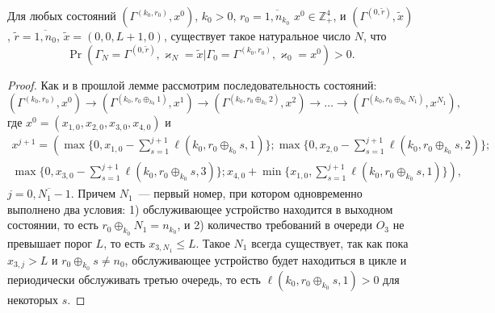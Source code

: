 \documentclass[a4paper,12pt,russian]{extarticle}
\begin{document}
\begin{lemma}
Для любых состояний $(\Gamma^{(k_0,r_0)},x^0)$, $k_0 > 0$, $r_0=\overline{1,n_{k_0}}$ $x^0 \in \mathbb{Z}_+^4$, и $(\Gamma^{(0,\tilde{r})},\tilde{x})$, $\tilde{r} = \overline{1,n_0}$, $\tilde{x}=(0,0,L+1,0)$, существует такое натуральное число $N$, что 
\begin{equation*}
\Pr(\Gamma_{N}=\Gamma^{(0,\tilde{r} )}, \varkappa_{N}=\tilde{x}|
\Gamma_{0}=\Gamma^{(k_0,r_0)}, \varkappa_{0}=x^0)>0.
\end{equation*}
\label{class:2}
\end{lemma}
\begin{proof}
Как и в прошлой лемме рассмотрим последовательность состояний: 
\begin{equation*}
(\Gamma^{(k_0,r_0)},x^0) \rightarrow (\Gamma^{(k_0,r_0\oplus_{k_0}1)},x^1) \rightarrow (\Gamma^{(k_0,r_0\oplus_{k_0}2)},x^2) \rightarrow \ldots \rightarrow (\Gamma^{(k_0,r_0\oplus_{k_0}N_1)},x^{N_1}),
\end{equation*}
где $x^0=(x_{1,0}, x_{2,0}, x_{3,0}, x_{4,0})$ и
\begin{multline*}
x^{j+1}=\left(\max{\{0,x_{1,0} - \sum_{s=1}^{j+1}\ell(k_0,r_0\oplus_{k_0}s,1)\}};
\max{\{0,x_{2,0} - \sum_{s=1}^{j+1}\ell(k_0,r_0\oplus_{k_0}s,2)\}};\right.\\
\left.\max{\{0,x_{3,0} - \sum_{s=1}^{j+1}\ell(k_0,r_0\oplus_{k_0}s,3)\}};
x_{4,0} + \min{\{x_{1,0}, \sum_{s=1}^{j+1}\ell(k_0,r_0\oplus_{k_0}s,1)\}}\right),
\end{multline*}
$j=\overline{0,N_1-1}$. Причем $N_1$~--- первый номер, при котором одновременно выполнено два условия: 1) обслуживающее устройство находится в выходном состоянии, то есть $r_0\oplus_{k_0}N_1 = n_{k_0}$, и 2) количество требований в очереди $O_3$ не превышает порог $L$, то есть  $x_{3,N_1}\leqslant L$. Такое $N_1$ всегда существует, так как пока $x_{3,j}>L$ и $r_0\oplus_{k_0}s \neq n_0$, обслуживающее устройство будет находиться в цикле и периодически обслуживать третью очередь, то есть $\ell(k_0,r_0\oplus_{k_0}s,1)>0$  для некоторых $s$.


\end{proof}
\end{document}
